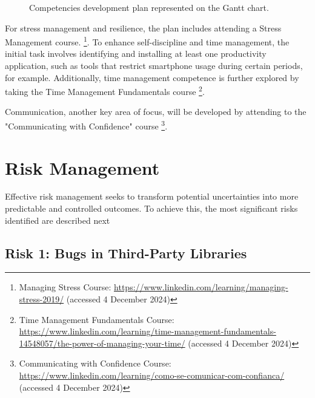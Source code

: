 \begin{figure}
      \centering
      \caption{Competencies development plan represented on the Gantt chart.}
      \label{fig:gantt_competency}
\end{figure}

For stress management and resilience, the plan includes attending a Stress Management course.
\footnote{Managing Stress Course: \url{https://www.linkedin.com/learning/managing-stress-2019/} (accessed 4 December 2024)}. To enhance self-discipline and time management, the initial task involves identifying and installing at least one productivity application, such as tools that restrict smartphone usage during certain periods, for example. Additionally, time management competence is further explored by taking the Time Management Fundamentals course
\footnote{Time Management Fundamentals Course: \url{https://www.linkedin.com/learning/time-management-fundamentals-14548057/the-power-of-managing-your-time/} (accessed 4 December 2024)}.

Communication, another key area of focus, will be developed by attending to the "Communicating with Confidence" course
\footnote{Communicating with Confidence Course: \url{https://www.linkedin.com/learning/como-se-comunicar-com-confianca/} (accessed 4 December 2024)}.

\section{Risk Management}

Effective risk management seeks to transform potential uncertainties into more predictable and controlled outcomes. To achieve this, the most significant risks identified are described next

\subsection{Risk 1: Bugs in Third-Party Libraries}


